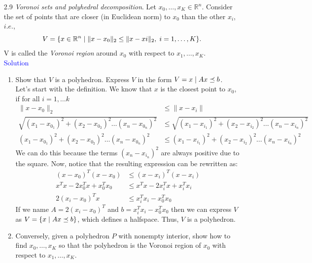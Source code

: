 \documentclass[12pt, oneside]{article}%
\def\R{{\mathbb R}}
\begin{document}
\begin{enumerate}[font=\bfseries]
\item [2.9] \textit{Voronoi sets and polyhedral decomposition}. Let $x_0, \dots, x_K \in \R^n$. Consider the set of points that are closer (in Euclidean norm) to $x_0$ than the other $x_i$, $i.e.$,
$$V = \{x \in \R^n \hspace{0.1cm} |\hspace{0.1cm} \|x - x_0\|_2 \leq \|x - xi\|_2, \hspace{0.1cm}i = 1, \dots ,K\}.$$
V is called the \textit{Voronoi region} around $x_0$ with respect to $x_1, \dots, x_K$.\\

\Large\textsf{\textcolor{blue}{Solution}}
\normalsize

\begin{enumerate}
    \item Show that $V$ is a polyhedron. Express $V$ in the form $V = {x\hspace{0.1cm} | \hspace{0.1cm} Ax \preceq  b}$.\\
    
    Let's start with the definition. We know that $x$ is the closest point to $x_0$, if for all $i=1,\dots k$  
    \begin{align*}
        \|x-x_0 \|_2 &\leq \|x-x_i\|\\
        \sqrt{(x_1-x_{0_1})^2+(x_2-x_{0_2})^2 \dots (x_n-x_{0_n})^2}&\leq\sqrt{(x_1-x_{i_1})^2+(x_2-x_{i_2})^2 \dots (x_n-x_{i_n})^2}\\
        (x_1-x_{0_1})^2+(x_2-x_{0_2})^2 \dots (x_n-x_{0_n})^2&\leq(x_1-x_{i_1})^2+(x_2-x_{i_2})^2 \dots (x_n-x_{i_n})^2
    \end{align*}
    We can do this because the terms $(x_n-x_{i_n})^2$ are always positive due to the square. Now, notice that the resulting expression can be rewritten as:
    \begin{align*}
        (x-x_0)^T(x-x_0)&\leq(x-x_i)^T(x-x_i)\\
        x^Tx - 2 x_0^T x + x_0^T x_0&\leq x^Tx - 2 x_i^T x + x_i^T x_i\\
        2(x_i-x_0)^T x &\leq x_i^T x_i - x_0^T x_0
    \end{align*}
    If we name $A=2(x_i-x_0)^T$ and $b=x_i^T x_i - x_0^T x_0$ then we can express $V$ as $V=\{x\hspace{0.1cm}|\hspace{0.1cm} Ax \preceq b\}$, which defines a halfspace. Thus, $V$ is a polyhedron.
    
    \item Conversely, given a polyhedron $P$ with nonempty interior, show how to find $x_0, \dots, x_K$ so that the polyhedron is the Voronoi region of $x_0$ with respect to $x_1,\dots, x_K$.\\
    

\end{enumerate}
\end{enumerate}
\end{document}
